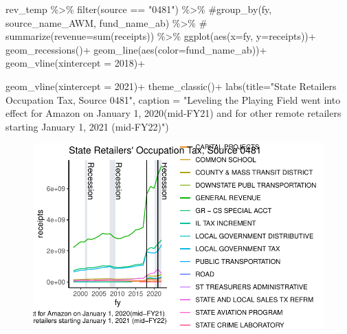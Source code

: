 \documentclass[
  letterpaper,
  DIV=11,
  numbers=noendperiod]{scrreport}
\newenvironment{Shaded}{\begin{snugshade}}{\end{snugshade}}
\newcommand{\AttributeTok}[1]{\textcolor[rgb]{0.40,0.45,0.13}{#1}}
\newcommand{\CommentTok}[1]{\textcolor[rgb]{0.37,0.37,0.37}{#1}}
\newcommand{\DecValTok}[1]{\textcolor[rgb]{0.68,0.00,0.00}{#1}}
\newcommand{\FunctionTok}[1]{\textcolor[rgb]{0.28,0.35,0.67}{#1}}
\newcommand{\NormalTok}[1]{\textcolor[rgb]{0.00,0.23,0.31}{#1}}
\newcommand{\SpecialCharTok}[1]{\textcolor[rgb]{0.37,0.37,0.37}{#1}}
\newcommand{\StringTok}[1]{\textcolor[rgb]{0.13,0.47,0.30}{#1}}
\begin{document}
\begin{Shaded}
\begin{Highlighting}[]
\NormalTok{rev\_temp }\SpecialCharTok{\%\textgreater{}\%} 
  \FunctionTok{filter}\NormalTok{(source }\SpecialCharTok{==} \StringTok{"0481"}\NormalTok{) }\SpecialCharTok{\%\textgreater{}\%}
  \CommentTok{\#group\_by(fy, source\_name\_AWM, fund\_name\_ab) \%\textgreater{}\% }
\CommentTok{\#  summarize(revenue=sum(receipts))  \%\textgreater{}\% }
  \FunctionTok{ggplot}\NormalTok{(}\FunctionTok{aes}\NormalTok{(}\AttributeTok{x=}\NormalTok{fy, }\AttributeTok{y=}\NormalTok{receipts))}\SpecialCharTok{+}
  \FunctionTok{geom\_recessions}\NormalTok{()}\SpecialCharTok{+}
  \FunctionTok{geom\_line}\NormalTok{(}\FunctionTok{aes}\NormalTok{(}\AttributeTok{color=}\NormalTok{fund\_name\_ab))}\SpecialCharTok{+}
    \FunctionTok{geom\_vline}\NormalTok{(}\AttributeTok{xintercept =} \DecValTok{2018}\NormalTok{)}\SpecialCharTok{+}

  \FunctionTok{geom\_vline}\NormalTok{(}\AttributeTok{xintercept =} \DecValTok{2021}\NormalTok{)}\SpecialCharTok{+}
  \FunctionTok{theme\_classic}\NormalTok{()}\SpecialCharTok{+}
  \FunctionTok{labs}\NormalTok{(}\AttributeTok{title=}\StringTok{"State Retailers\textquotesingle{} Occupation Tax, Source 0481"}\NormalTok{,}
       \AttributeTok{caption =} \StringTok{"Leveling the Playing Field went into effect for Amazon on January 1, 2020(mid{-}FY21) }
\StringTok{       and for other remote retailers starting January 1, 2021 (mid{-}FY22)"}\NormalTok{)}
\end{Highlighting}
\end{Shaded}

\begin{figure}[H]

{\centering \includegraphics{./Everything_files/figure-pdf/unnamed-chunk-13-1.pdf}

}

\end{figure}
\end{document}
